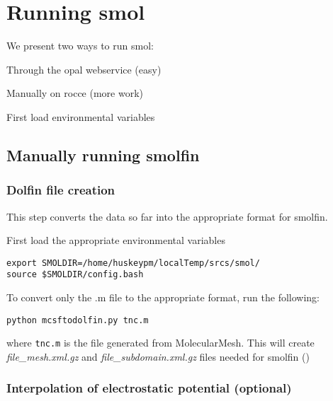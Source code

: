 \documentclass{article}
\begin{document}
\section{Running smol}
\label{runsmol}
We present two ways to run smol:
\lbn
\item Through the opal webservice  (easy) 
\item Manually on rocce  (more work)
\len

First load environmental variables

\subsection{Manually running smolfin}
\label{roccerun} 

\subsubsection{Dolfin file creation}
This step converts the data so far into the appropriate format for smolfin. 

First load the appropriate environmental variables
\begin{verbatim}
export SMOLDIR=/home/huskeypm/localTemp/srcs/smol/
source $SMOLDIR/config.bash
\end{verbatim}



To convert only the .m file to the appropriate format, run the
following:

\begin{verbatim}
python mcsftodolfin.py tnc.m
\end{verbatim}

where \verb!tnc.m! is the file generated from MolecularMesh.
This will create \textit{file\_mesh.xml.gz}  and
\textit{file\_subdomain.xml.gz} files needed for smolfin () 




\subsubsection{Interpolation of electrostatic potential (optional)}
\label{electroconv}
\end{document}
